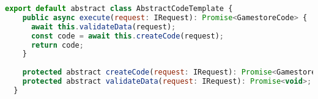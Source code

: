 \begin{lstlisting}[language=JavaScript, caption={Classe Abstrata},captionpos=b, label=alg:abstractcode]
  export default abstract class AbstractCodeTemplate {
    public async execute(request: IRequest): Promise<GamestoreCode> {
      await this.validateData(request);
      const code = await this.createCode(request);
      return code;
    }
  
    protected abstract createCode(request: IRequest): Promise<GamestoreCode>;
    protected abstract validateData(request: IRequest): Promise<void>;
  }
\end{lstlisting}  